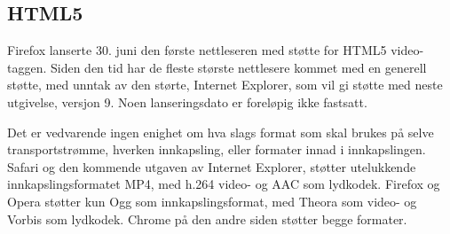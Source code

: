 \subsection{HTML5}

Firefox lanserte 30. juni den første nettleseren med støtte for HTML5 video-taggen. Siden den tid har de fleste største nettlesere kommet med en generell støtte, med unntak av den størte, Internet Explorer, som vil gi støtte med neste utgivelse, versjon 9. Noen lanseringsdato er foreløpig ikke fastsatt.

Det er vedvarende ingen enighet om hva slags format som skal brukes på selve transportstrømme, hverken innkapsling, eller formater innad i innkapslingen. Safari og den kommende utgaven av Internet Explorer, støtter utelukkende innkapslingsformatet MP4, med h.264 video- og AAC som lydkodek. Firefox og Opera støtter kun Ogg som innkapslingsformat, med Theora som video- og Vorbis som lydkodek. Chrome på den andre siden støtter begge formater.

